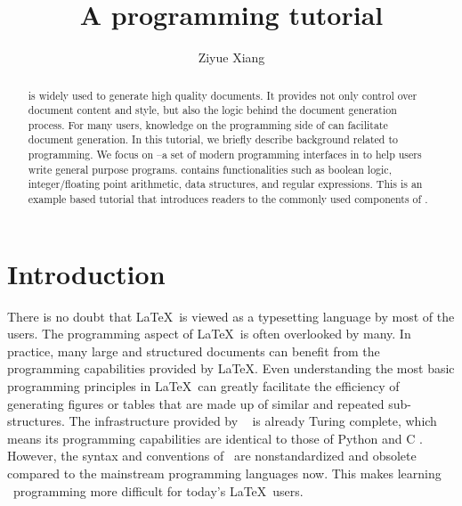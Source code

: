\documentclass{ltugboat}
\title{A \LTT{} programming tutorial}
\author{Ziyue Xiang}
\begin{document}
\begin{abstract}
\LT{} is widely used to generate high quality documents.
It provides not only control over document content and style, but also the logic behind the document generation process.
For many users, knowledge on the programming side of \LT{} can facilitate document generation.
In this tutorial, we briefly describe background related to \LT{} programming.
We focus on \LTT{}--a set of modern programming interfaces in \LT{} to help users write general purpose programs.
\LTT{} contains functionalities such as boolean logic, integer/floating point arithmetic, data structures, and regular expressions.
This is an example based \LTT{} tutorial that introduces readers to the commonly used components of \LTT{}.
\end{abstract}

\maketitle

\tableofcontents
\ListOfCodeExample


\section{Introduction}




There is no doubt that \LaTeX~is viewed as a typesetting language by most of the users.
The programming aspect of \LaTeX~is often overlooked by many.
In practice, many large and structured documents can benefit from the programming capabilities provided by \LaTeX. 
Even understanding the most basic programming principles in \LaTeX~can greatly facilitate the efficiency of generating figures or tables that are made up of similar and repeated sub-structures.
The infrastructure provided by \LaTeXe\ \cite{berry2017latex} is already Turing complete, which means its programming capabilities are identical to those of Python \cite{vanrossum2010python} and C \cite{ritchie1988c}.
However, the syntax and conventions of \LaTeXe~are nonstandardized and obsolete compared to the mainstream programming languages now.
This makes learning \LaTeXe~programming more difficult for today's \LaTeX~users.
\end{document}
